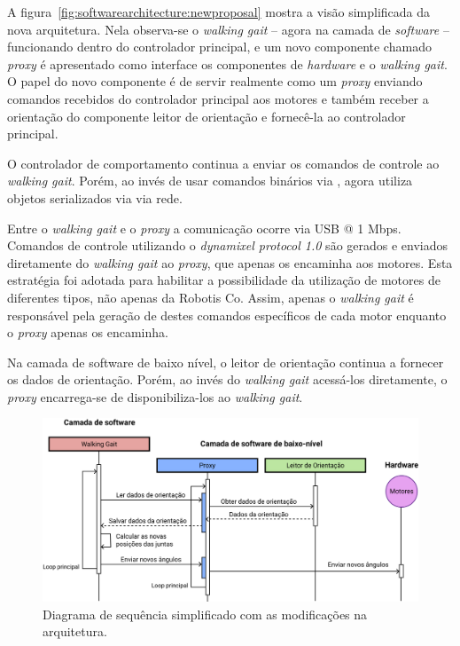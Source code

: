 A figura~\ref{fig:softwarearchitecture:newproposal} mostra a visão simplificada da nova arquitetura. Nela observa-se o \textit{walking gait} -- agora na camada de \textit{software} -- funcionando dentro do controlador principal, e um novo componente chamado \textit{proxy} é apresentado como interface os componentes de \textit{hardware} e o \textit{walking gait}. O papel do novo componente é de servir realmente como um \textit{proxy} enviando comandos recebidos do controlador principal aos motores e também receber a orientação do componente leitor de orientação e fornecê-la ao controlador principal.

O controlador de comportamento continua a enviar os comandos de controle ao \textit{walking gait}. Porém, ao invés de usar comandos binários via , agora utiliza objetos serializados via  via rede.

Entre o \textit{walking gait} e o \textit{proxy} a comunicação ocorre via USB @ 1 Mbps. Comandos de controle utilizando o \textit{dynamixel protocol 1.0} são gerados e enviados diretamente do \textit{walking gait} ao \textit{proxy}, que apenas os encaminha aos motores. Esta estratégia foi adotada para habilitar a possibilidade da utilização de motores de diferentes tipos, não apenas da Robotis Co. Assim, apenas o \textit{walking gait} é responsável pela geração de destes comandos específicos de cada motor enquanto o \textit{proxy} apenas os encaminha.

Na camada de software de baixo nível, o leitor de orientação continua a fornecer os dados de orientação. Porém, ao invés do \textit{walking gait} acessá-los diretamente, o \textit{proxy} encarrega-se de disponibiliza-los ao \textit{walking gait}.

\begin{figure}[h!]
	\centering
	\includegraphics[scale=1]{imagens/svg/softwarearchitecture-newproposal-sequence}
	\caption{Diagrama de sequência simplificado com as modificações na arquitetura.}
	\label{fig:softwarearchitecture:newproposal:sequence}
\end{figure}

